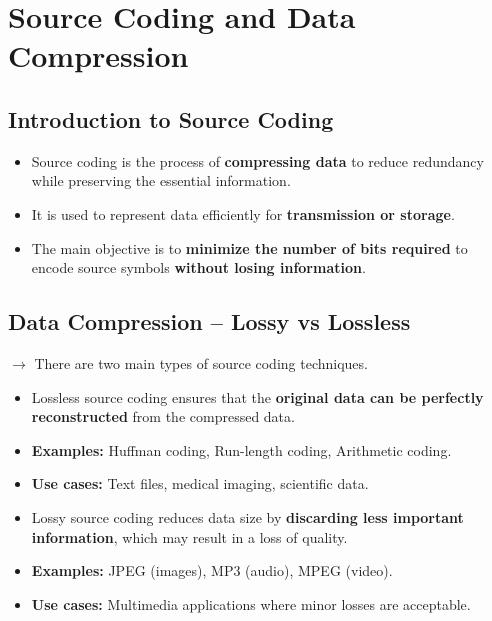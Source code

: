\documentclass[11pt,a4paper]{book}
\newenvironment{definitionbox}[1][Definition]{
    \begin{tcolorbox}[
        enhanced,
        breakable,
        colback=primaryblue!10,
        colframe=primaryblue!150,
        title=#1,
        fonttitle=\bfseries,
        sharp corners,
        boxrule=0.8pt,
        left=8pt,
        right=8pt,
        top=6pt,
        bottom=6pt
    ]
}{
    \end{tcolorbox}
}
\begin{document}
\chapter{Source Coding and Data Compression}

\section{Introduction to Source Coding}

\begin{definitionbox}[Source Coding]
\begin{itemize}
    \item Source coding is the process of \textbf{compressing data} to reduce redundancy
    while preserving the essential information.
    \item It is used to represent data efficiently for \textbf{transmission or storage}.
    \item The main objective is to \textbf{minimize the number of bits required}
    to encode source symbols \textbf{without losing information}.
\end{itemize}
\end{definitionbox}

\section{Data Compression -- Lossy vs Lossless}

$\rightarrow$ There are two main types of source coding techniques.

\begin{definitionbox}[Lossless Source Coding]
\begin{itemize}
    \item Lossless source coding ensures that the \textbf{original data can be perfectly
    reconstructed} from the compressed data.
    \item \textbf{Examples:} Huffman coding, Run-length coding, Arithmetic coding.
    \item \textbf{Use cases:} Text files, medical imaging, scientific data.
\end{itemize}
\end{definitionbox}

\begin{definitionbox}[Lossy Source Coding]
\begin{itemize}
    \item Lossy source coding reduces data size by \textbf{discarding less important
    information}, which may result in a loss of quality.
    \item \textbf{Examples:} JPEG (images), MP3 (audio), MPEG (video).
    \item \textbf{Use cases:} Multimedia applications where minor losses are acceptable.
\end{itemize}
\end{definitionbox}
\end{document}
